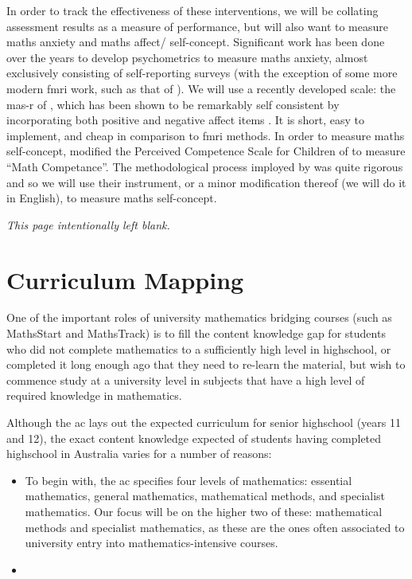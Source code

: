 \documentclass[twoside,12pt,a4paper]{report}
\makeatletter
\newcommand*{\intentionallyblankpage}{
  \vspace*{\fill}
  {\centering \textit{This page intentionally left blank.} \par}
  \vspace{\fill}}
\renewcommand*{\cleardoublepage}{\clearpage\if@twoside \ifodd\c@page\else
  \intentionallyblankpage
  \newpage
  \if@twocolumn\hbox{}\newpage\fi\fi\fi}
\makeatother
\begin{document}
In order to track the effectiveness of these interventions, we will be collating assessment results as a measure of performance, but will also want to measure maths anxiety and maths affect/ self-concept. Significant work has been done over the years to develop psychometrics to measure maths anxiety, almost exclusively consisting of self-reporting surveys (with the exception of some more modern \gls{fmri} work, such as that of ). We will use a recently developed scale: the \gls{mas-r} of , which has been shown to be remarkably self consistent by incorporating both positive and negative affect items \cite{Bai2011}. It is short, easy to implement, and cheap in comparison to \gls{fmri} methods. In order to measure maths self-concept,  modified the Perceived Competence Scale for Children of  to measure ``Math Competance''. The methodological process imployed by  was quite rigorous and so we will use their instrument, or a minor modification thereof (we will do it in English), to measure maths self-concept.












\cleardoublepage
\chapter{Curriculum Mapping}
\label{chap:curriculum}

One of the important roles of university mathematics bridging courses (such as MathsStart and MathsTrack) is to fill the content knowledge gap for students who did not complete mathematics to a sufficiently high level in highschool, or completed it long enough ago that they need to re-learn the material, but wish to commence study at a university level in subjects that have a high level of required knowledge in mathematics. 

Although the \gls{ac} lays out the expected curriculum for senior highschool (years 11 and 12), the exact content knowledge expected of students having completed highschool in Australia varies for a number of reasons:
\begin{itemize}
	\item To begin with, the \gls{ac} specifies four levels of mathematics: essential mathematics, general mathematics, mathematical methods, and specialist mathematics. Our focus will be on the higher two of these: mathematical methods and specialist mathematics, as these are the ones often associated to university entry into mathematics-intensive courses. 
	\item 
\end{itemize}
\end{document}
